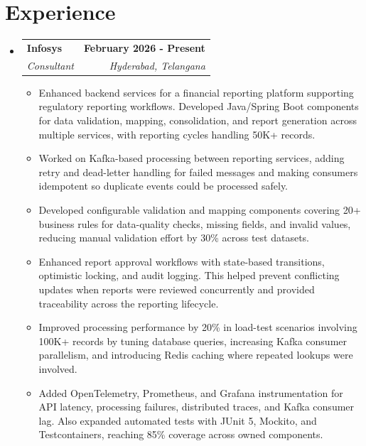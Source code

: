 \documentclass[letterpaper,11pt]{article}
\makeatletter
\newcommand{\resumeItem}[1]{
  \item\small{
    {#1 \vspace{-2pt}}
  }
}
\newcommand{\resumeSubheading}[4]{
  \vspace{-2pt}\item
    \begin{tabular*}{1.0\textwidth}[t]{l@{\extracolsep{\fill}}r}
      \textbf{#1} & \textbf{\small #2} \\
      \textit{\small#3} & \textit{\small #4} \\
    \end{tabular*}\vspace{-7pt}
}
\newcommand{\resumeSubHeadingListStart}{\begin{itemize}[leftmargin=0.0in, label={}]}
\newcommand{\resumeSubHeadingListEnd}{\end{itemize}}
\newcommand{\resumeItemListStart}{\begin{itemize}}
\newcommand{\resumeItemListEnd}{\end{itemize}\vspace{-5pt}}
\makeatother
\begin{document}
 \vspace{-16pt}
\section{Experience}
  \resumeSubHeadingListStart
    \resumeSubheading
      {Infosys}{February 2026 - Present}
      {Consultant}{Hyderabad, Telangana}
      \resumeItemListStart
      \vspace{4pt}
        \resumeItem{Enhanced backend services for a financial reporting platform supporting regulatory reporting workflows. Developed Java/Spring Boot components for data validation, mapping, consolidation, and report generation across multiple services, with reporting cycles handling 50K+ records.}
        \vspace{4pt}
        \resumeItem{Worked on Kafka-based processing between reporting services, adding retry and dead-letter handling for failed messages and making consumers idempotent so duplicate events could be processed safely.}
        \vspace{4pt}
        \resumeItem{Developed configurable validation and mapping components covering 20+ business rules for data-quality checks, missing fields, and invalid values, reducing manual validation effort by 30\% across test datasets.}
        \vspace{4pt}
        \resumeItem{Enhanced report approval workflows with state-based transitions, optimistic locking, and audit logging. This helped prevent conflicting updates when reports were reviewed concurrently and provided traceability across the reporting lifecycle.}
        \vspace{4pt}
        \resumeItem{Improved processing performance by 20\% in load-test scenarios involving 100K+ records by tuning database queries, increasing Kafka consumer parallelism, and introducing Redis caching where repeated lookups were involved.}
        \vspace{4pt}
        \resumeItem{Added OpenTelemetry, Prometheus, and Grafana instrumentation for API latency, processing failures, distributed traces, and Kafka consumer lag. Also expanded automated tests with JUnit 5, Mockito, and Testcontainers, reaching 85\% coverage across owned components.}
      \resumeItemListEnd
  \resumeSubHeadingListEnd
\end{document}
